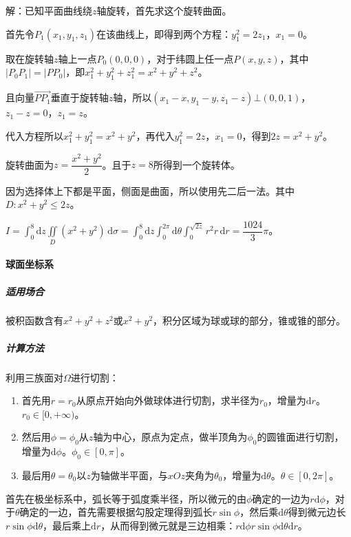 \documentclass[UTF8, 12pt]{ctexart}
\begin{document}
解：已知平面曲线绕$z$轴旋转，首先求这个旋转曲面。

首先令$P_1(x_1,y_1,z_1)$在该曲线上，即得到两个方程：$y_1^2=2z_1$，$x_1=0$。

取在旋转轴$z$轴上一点$P_0(0,0,0)$，对于纬圆上任一点$P(x,y,z)$，其中$\vert P_0P_1\vert=\vert PP_0\vert$，即$x_1^2+y_1^2+z_1^2=x^2+y^2+z^2$。

且向量$\overrightarrow{PP_1}$垂直于旋转轴$z$轴，所以$(x_1-x,y_1-y,z_1-z)\bot(0,0,1)$，$z_1-z=0$，$z_1=z$。

代入方程所以$x_1^2+y_1^2=x^2+y^2$，再代入$y_1^2=2z$，$x_1=0$，得到$2z=x^2+y^2$。

旋转曲面为$z=\dfrac{x^2+y^2}{2}$。且于$z=8$所得到一个旋转体。

因为选择体上下都是平面，侧面是曲面，所以使用先二后一法。其中$D:x^2+y^2\leqslant2z$。

$I=\int_0^8\textrm{d}z\iint\limits_D(x^2+y^2)\,\textrm{d}\sigma=\int_0^8\textrm{d}z\int_0^{2\pi}\textrm{d}\theta\int_0^{\sqrt{2z}}r^2r\,\textrm{d}r=\dfrac{1024}{3}\pi$。

\paragraph{球面坐标系} \leavevmode \medskip

\subparagraph{适用场合} \leavevmode \medskip

被积函数含有$x^2+y^2+z^2$或$x^2+y^2$，积分区域为球或球的部分，锥或锥的部分。

\subparagraph{计算方法} \leavevmode \medskip

利用三族面对$\Omega$进行切割：

\begin{enumerate}
    \item 首先用$r=r_0$从原点开始向外做球体进行切割，求半径为$r_0$，增量为$\textrm{d}r$。$r_0\in[0,+\infty)$。
    \item 然后用$\phi=\phi_0$从$z$轴为中心，原点为定点，做半顶角为$\phi_0$的圆锥面进行切割，增量为$\textrm{d}\phi$。$\phi_0\in[0,\pi]$。
    \item 最后用$\theta=\theta_0$以$z$为轴做半平面，与$xOz$夹角为$\theta_0$，增量为$\textrm{d}\theta$。$\theta\in[0,2\pi]$。
\end{enumerate}

首先在极坐标系中，弧长等于弧度乘半径，所以微元的由$\phi$确定的一边为$r\textrm{d}\phi$，对于$\theta$确定的一边，首先需要根据勾股定理得到弧长$r\sin\phi$，然后乘$\textrm{d}\theta$得到微元边长$r\sin\phi\textrm{d}\theta$，最后乘上$\textrm{d}r$，从而得到微元就是三边相乘：$r\textrm{d}\phi r\sin\phi\textrm{d}\theta\textrm{d}r$。
\end{document}
